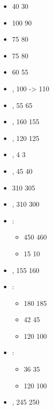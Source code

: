 
\largefontsize{}

\subtitle{beta 2.2}

\begin{itemize}
\item \vonkarnsteinbloodline{} 40 \costdown{} 30
\item \stormcaller{} 100 \costdown{} 90
\item \ghoullord{} 75 \costup{} 80
\item \arcaneknowledge{} 75 \costup{} 80
\item \nightscrown{} 60 \costdown{} 55
\item \vampirecourtier{}, \spectralsteed{} 100 -> 110
\item \barrowking{}, \skeletalsteed{} 55 \costup{} 65
\item \banshee{}, \basecost{} 160 \costdown{} 155
\item \zombies{}, \basecost{} 120 \costup{} 125
\item \barrowguard{}, \halberd{} 4 \costdown{} 3
\item \barrowknights{}, \extramodel{} 45 \costdown{} 40
\item \cadaverwagon{} \basecost{} 310 \costdown{} 305
\item \courtofthedamned{}, \basecost{} 310 \costdown{} 300
\item \darkcoach{}\spacebeforecolon{}:
\begin{itemize}
\item \basecost{} 450 \costup{} 460
\item \extendedchassis{} 15 \costdown{} 10
\end{itemize}
\item {}, \basecost{} 155 \costup{} 160
\item \wraiths{}\spacebeforecolon{}:
\begin{itemize}
\item \basecost{} 180 \costup{} 185
\item \extramodel{} 42 \costup{} 45
\item \champion{} 120 \costdown{} 100
\end{itemize}
\item \spectralhunters{}\spacebeforecolon{}:
\begin{itemize}
\item \extramodel{} 36 \costdown{} 35
\item \champion{} 120 \costdown{} 100
\end{itemize}
\item \vampireknights{}, \basecost{} 245 \costup{} 250

\end{itemize}

